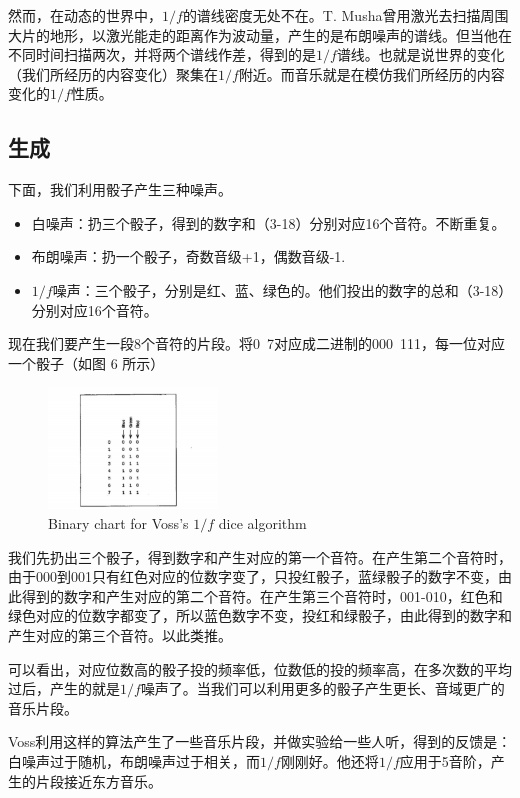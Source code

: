 \documentclass[11pt]{article}
\begin{document}
然而，在动态的世界中，$1/f$的谱线密度无处不在。T. Musha曾用激光去扫描周围大片的地形，以激光能走的距离作为波动量，产生的是布朗噪声的谱线。但当他在不同时间扫描两次，并将两个谱线作差，得到的是$1/f$谱线。也就是说世界的变化（我们所经历的内容变化）聚集在$1/f$附近。而音乐就是在模仿我们所经历的内容变化的$1/f$性质。

\subsection{生成}
下面，我们利用骰子产生三种噪声。
\begin{itemize}
\item 白噪声：扔三个骰子，得到的数字和（3-18）分别对应16个音符。不断重复。
\item 布朗噪声：扔一个骰子，奇数音级+1，偶数音级-1.
\item $1/f$噪声：三个骰子，分别是红、蓝、绿色的。他们投出的数字的总和（3-18）分别对应16个音符。
\end{itemize}
现在我们要产生一段8个音符的片段。将0~7对应成二进制的000~111，每一位对应一个骰子（如图 6 所示）

\begin{figure}[hptb]
	\centering
	\label{fig:1.2.3}
	\includegraphics[width=0.4\textwidth]{pic/1.2.3.eps}
	\caption{Binary chart for Voss's $1/f$ dice algorithm}
\end{figure}

我们先扔出三个骰子，得到数字和产生对应的第一个音符。在产生第二个音符时，由于000到001只有红色对应的位数字变了，只投红骰子，蓝绿骰子的数字不变，由此得到的数字和产生对应的第二个音符。在产生第三个音符时，001-010，红色和绿色对应的位数字都变了，所以蓝色数字不变，投红和绿骰子，由此得到的数字和产生对应的第三个音符。以此类推。

可以看出，对应位数高的骰子投的频率低，位数低的投的频率高，在多次数的平均过后，产生的就是$1/f$噪声了。当我们可以利用更多的骰子产生更长、音域更广的音乐片段。

Voss利用这样的算法产生了一些音乐片段，并做实验给一些人听，得到的反馈是：
白噪声过于随机，布朗噪声过于相关，而$1/f$刚刚好。他还将$1/f$应用于5音阶，产生的片段接近东方音乐。
\end{document}
